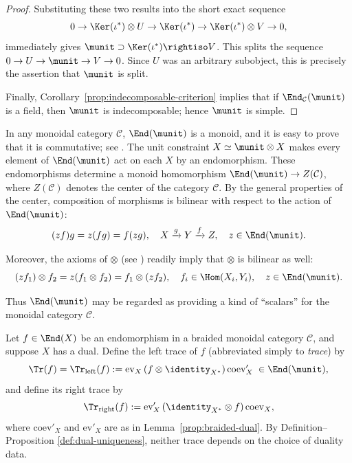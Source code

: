 \begin{proof}
	Substituting these two results into the short exact sequence
	\[ 0 \to \Ker(\iota^*) \otimes U \to \Ker(\iota^*) \to \Ker(\iota^*) \otimes V \to 0, \]
	immediately gives $\munit\supset\Ker(\iota^*)\rightiso V$. This splits the
sequence $0\to U\to\munit\to V\to0$. Since $U$ was an arbitrary subobject,
this is precisely the assertion that $\munit$ is split.

	Finally, Corollary~\ref{prop:indecomposable-criterion} implies that if
$\End_{\mathcal{C}}(\munit)$ is a field, then $\munit$ is indecomposable;
hence $\munit$ is simple.
\end{proof}

In any monoidal category $\mathcal{C}$, $\End(\munit)$ is a monoid, and it is
easy to prove that it is commutative; see \cite[Chapter 3 exercises]{Li1}.
The unit constraint $X\simeq\munit\otimes X$ makes every element of
$\End(\munit)$ act on each $X$ by an endomorphism. These endomorphisms
determine a monoid homomorphism $\End(\munit)\to Z(\mathcal{C})$, where
$Z(\mathcal{C})$ denotes the center of the category $\mathcal{C}$. By the
general properties of the center, composition of morphisms is bilinear with
respect to the action of $\End(\munit)$:
\[ (z f) g = z(f g) = f (z g), \quad X \xrightarrow{g} Y \xrightarrow{f} Z, \quad z \in \End(\munit). \]

Moreover, the axioms of $\otimes$ (see \cite[\S 3.1]{Li1}) readily imply
that $\otimes$ is bilinear as well:
\[ (zf_1) \otimes f_2 = z(f_1 \otimes f_2) = f_1 \otimes (z f_2), \quad f_i \in \Hom(X_i, Y_i), \quad z \in \End(\munit). \]

Thus $\End(\munit)$ may be regarded as providing a kind of ``scalars'' for
the monoidal category $\mathcal{C}$.

\begin{definition}
	Let $f\in\End(X)$ be an endomorphism in a braided monoidal category
$\mathcal{C}$, and suppose $X$ has a dual. Define the left trace of $f$
(abbreviated simply to \emph{trace}) by
	\[ \Tr(f) = \Tr_{\text{left}}(f) := \mathrm{ev}_X \left( f \otimes \identity_{X^*} \right) \mathrm{coev}'_X \; \in \End(\munit), \]
	and define its right trace by
	\[ \Tr_{\text{right}}(f) := \mathrm{ev}'_X \left( \identity_{X^*} \otimes f \right) \mathrm{coev}_X, \]
	where $\mathrm{coev}'_X$ and $\mathrm{ev}'_X$ are as in
Lemma~\ref{prop:braided-dual}. By Definition--Proposition
\ref{def:dual-uniqueness}, neither trace depends on the choice of duality
data.
\end{definition}

